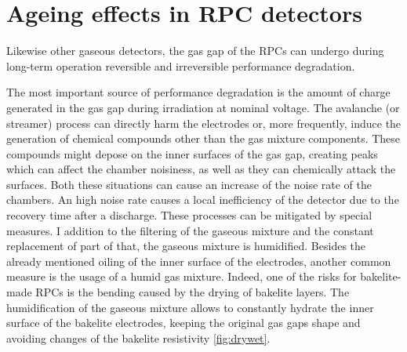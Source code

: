 

\section{Ageing effects in RPC detectors}
Likewise other gaseous detectors, the gas gap of the RPCs can undergo during long-term operation reversible and irreversible performance degradation.

The most important source of performance degradation is the amount of charge generated in the gas gap during irradiation at nominal voltage.
The avalanche (or streamer) process can directly harm the electrodes or, more frequently, induce the generation of chemical compounds other than the gas mixture components.
These compounds might depose on the inner surfaces of the gas gap, creating peaks which can affect the chamber noisiness, as well as they can chemically attack the surfaces.
Both these situations can cause an increase of the noise rate of the chambers.
An high noise rate causes a local inefficiency of the detector due to the recovery time after a discharge.
These processes can be mitigated by special measures.
I addition to the filtering of the gaseous mixture and the constant replacement of part of that, the gaseous mixture is humidified.
Besides the already mentioned oiling of the inner surface of the electrodes, another common measure is the usage of a humid gas mixture. Indeed, one of the risks for bakelite-made RPCs is the bending caused by the drying of bakelite layers. 
The humidification of the gaseous mixture allows to constantly hydrate the inner surface of the bakelite electrodes, keeping the original gas gaps shape and avoiding changes of the bakelite resistivity \ref{fig:drywet}.

